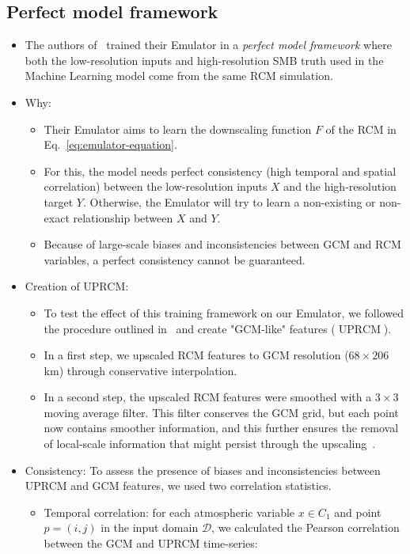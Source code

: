 \documentclass[a4paper,11pt,oneside]{report}
\begin{document}
\subsection{Perfect model framework}\label{subsec:perfect-model}
\begin{itemize}
    \item The authors of~\cite{Kittel} trained their Emulator in a \textit{perfect model framework} where both the low-resolution inputs and high-resolution SMB truth used in the Machine Learning model come from the same RCM simulation. 
    \item Why:
    \begin{itemize}
        \item Their Emulator aims to learn the downscaling function $F$ of the RCM in Eq.~\ref{eq:emulator-equation}.
        \item For this, the model needs perfect consistency (high temporal and spatial correlation) between the low-resolution inputs $X$ and the high-resolution target $Y$. Otherwise, the Emulator will try to learn a non-existing or non-exact relationship between $X$ and $Y$.
        \item Because of large-scale biases and inconsistencies between GCM and RCM variables, a perfect consistency cannot be guaranteed.
    \end{itemize}
    \item Creation of UPRCM: 
    \begin{itemize}
        \item To test the effect of this training framework on our Emulator, we followed the procedure outlined in~\cite{Doury} and create "GCM-like" features ($\operatorname{UPRCM}$).
        \item In a first step, we upscaled RCM features to GCM resolution ($68\times206$ km) through conservative interpolation. 
        \item In a second step, the upscaled RCM features were smoothed with a $3\times3$ moving average filter. This filter conserves the GCM grid, but each point now contains smoother information, and this further ensures the removal of local-scale information that might persist through the upscaling~\cite{Doury, Klaver2020}.
    \end{itemize}
    \item Consistency: To assess the presence of biases and inconsistencies between UPRCM and GCM features, we used two correlation statistics.  
    \begin{itemize}
        \item Temporal correlation: for each atmospheric variable $x\in C_1$ and point $p = (i,j)$ in the input domain $\mathcal{D}$, we calculated the Pearson correlation between the GCM and UPRCM time-series:

\end{itemize}
\end{itemize}
\end{document}
